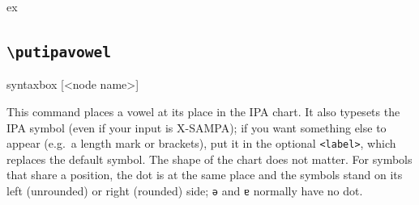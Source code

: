 \documentclass[a4paper,11pt]{article}
\newcommand\cmd[1]{\texttt{\textbackslash #1}}
\begin{document}
\begin{tcblisting}{ex}
\begin{vowelchart}[labelbg=off, contour=off]
  \color{red!80!black} %
  \color{green!50!black} %
\end{vowelchart}
\end{tcblisting}




\needspace{5em}
\subsection{\cmd{putipavowel}}\label{sec:putipavowel}

\begin{tcblisting}{syntaxbox}
[<node name>]
\end{tcblisting}

\noindent
This command places a vowel at its place in the IPA chart. It also typesets the IPA symbol (even if your input is X-SAMPA); if you want something else to appear
(e.g.\ a length mark or brackets), put it in the optional \texttt{<label>}, which replaces the default symbol. The shape of the chart does not matter. For symbols that share a position, the
dot is at the same place and the symbols stand on its left (unrounded) or
right (rounded) side; \texttt{ə} and \texttt{ɐ} normally have no dot.
\end{document}
